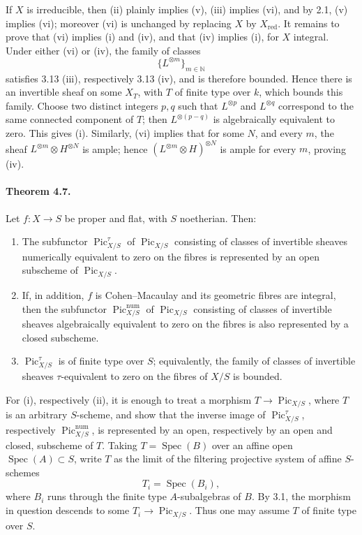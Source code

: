 \documentclass[11pt]{article}
\theoremstyle{plain}
\theoremstyle{definition}
\theoremstyle{remark}
\newcommand{\NN}{\mathbb N}
\DeclareMathOperator{\Spec}{Spec}
\DeclareMathOperator{\Pic}{Pic}
\providecommand{\red}{\mathrm{red}}
\providecommand{\num}{\mathrm{num}}
\begin{document}
If $X$ is irreducible, then (ii) plainly implies (v), (iii) implies (vi), and by 2.1, (v) implies (vi); moreover (vi) is unchanged by replacing $X$ by $X_{\red}$. It remains to prove that (vi) implies (i) and (iv), and that (iv) implies (i), for $X$ integral. Under either (vi) or (iv), the family of classes
\[
\{L^{\otimes m}\}_{m\in\NN}
\]
satisfies 3.13 (iii), respectively 3.13 (iv), and is therefore bounded. Hence there is an invertible sheaf on some $X_T$, with $T$ of finite type over $k$, which bounds this family. Choose two distinct integers $p,q$ such that $L^{\otimes p}$ and $L^{\otimes q}$ correspond to the same connected component of $T$; then $L^{\otimes(p-q)}$ is algebraically equivalent to zero. This gives (i). Similarly, (vi) implies that for some $N$, and every $m$, the sheaf $L^{\otimes m}\otimes H^{\otimes N}$ is ample; hence $(L^{\otimes m}\otimes H)^{\otimes N}$ is ample for every $m$, proving (iv).

\paragraph{Theorem 4.7.}
Let $f:X\to S$ be proper and flat, with $S$ noetherian. Then:
\begin{enumerate}[label=\roman*)]
\item The subfunctor $\Pic^\tau_{X/S}$ of $\Pic_{X/S}$ consisting of classes of invertible sheaves numerically equivalent to zero on the fibres is represented by an open subscheme of $\Pic_{X/S}$.
\item If, in addition, $f$ is Cohen--Macaulay and its geometric fibres are integral, then the subfunctor $\Pic^{\num}_{X/S}$ of $\Pic_{X/S}$ consisting of classes of invertible sheaves algebraically equivalent to zero on the fibres is also represented by a closed subscheme.
\item $\Pic^\tau_{X/S}$ is of finite type over $S$; equivalently, the family of classes of invertible sheaves $\tau$-equivalent to zero on the fibres of $X/S$ is bounded.
\end{enumerate}

For (i), respectively (ii), it is enough to treat a morphism $T\to \Pic_{X/S}$, where $T$ is an arbitrary $S$-scheme, and show that the inverse image of $\Pic^\tau_{X/S}$, respectively $\Pic^{\num}_{X/S}$, is represented by an open, respectively by an open and closed, subscheme of $T$. Taking $T=\Spec(B)$ over an affine open $\Spec(A)\subset S$, write $T$ as the limit of the filtering projective system of affine $S$-schemes
\[
T_i=\Spec(B_i),
\]
where $B_i$ runs through the finite type $A$-subalgebras of $B$. By 3.1, the morphism in question descends to some $T_i\to \Pic_{X/S}$. Thus one may assume $T$ of finite type over $S$.
\end{document}
